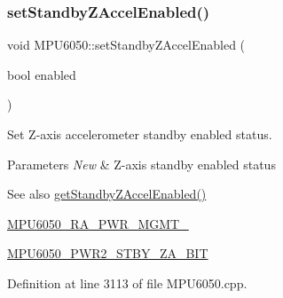 \begin{DoxyCode}{0}

\end{DoxyCode}
\mbox{\label{classMPU6050_ac5fd917549d2ed0f12b8a17167271199}} 
\subsubsection{\texorpdfstring{setStandbyZAccelEnabled()}{setStandbyZAccelEnabled()}}
{\footnotesize\ttfamily void M\+P\+U6050\+::set\+Standby\+Z\+Accel\+Enabled (\begin{DoxyParamCaption}\item[{bool}]{enabled }\end{DoxyParamCaption})}

Set Z-\/axis accelerometer standby enabled status. 
\begin{DoxyParams}{Parameters}
{\em New} & Z-\/axis standby enabled status \\
\hline
\end{DoxyParams}
\begin{DoxySeeAlso}{See also}
\mbox{\hyperlink{classMPU6050_adae85612e047c4c7f0c3b7110fc92956}{get\+Standby\+Z\+Accel\+Enabled()}} 

\mbox{\hyperlink{MPU6050_8h_aace6ce286da4d5f8c8f5ba6f80688e13}{M\+P\+U6050\+\_\+\+R\+A\+\_\+\+P\+W\+R\+\_\+\+M\+G\+M\+T\+\_}} 

\mbox{\hyperlink{MPU6050_8h_a913262cf8ad43c4dcb28aa31521fac23}{M\+P\+U6050\+\_\+\+P\+W\+R2\+\_\+\+S\+T\+B\+Y\+\_\+\+Z\+A\+\_\+\+B\+IT}} 
\end{DoxySeeAlso}


Definition at line 3113 of file M\+P\+U6050.\+cpp.


